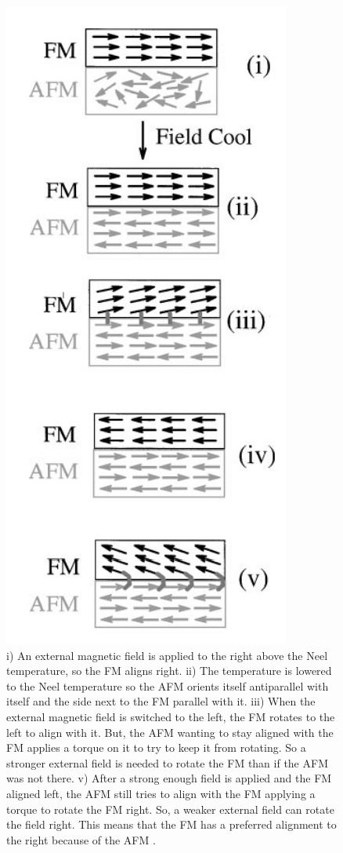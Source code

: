 \documentclass[ notitlepage, numerical, 11pt]{revtex4-1} %
\begin{document}
\begin{figure}[H]
\centerline{\includegraphics[scale=.45]{exchange.png}}
\caption{i) An external magnetic field is applied to the right above the Neel temperature, so the FM aligns right. ii) The temperature is lowered to the Neel temperature so the AFM orients itself antiparallel with itself and the side next to the FM parallel with it. iii) When the external magnetic field is switched to the left, the FM rotates to the left to align with it. But, the AFM wanting to stay aligned with the FM applies a torque on it to try to keep it from rotating. So a stronger external field is needed to rotate the FM than if the AFM was not there. v) After a strong enough field is applied and the FM aligned left, the AFM still tries to align with the FM applying a torque to rotate the FM right. So, a weaker external field can rotate the field right. This means that the FM has a preferred alignment to the right because of the AFM \cite{schull}.}
\label{exchange}
\end{figure}
\end{document}
